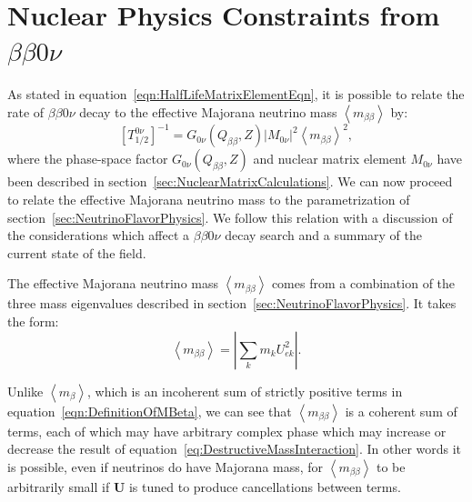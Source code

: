 \section{Nuclear Physics Constraints from \texorpdfstring{$\beta\beta 0\nu$}{Neutrinoless Double-Beta}}\label{sec:NucPhysConstraintsFromBB0N}

As stated in equation~\ref{eqn:HalfLifeMatrixElementEqn}, it is possible to relate the rate of $\beta\beta 0\nu$ decay to the effective Majorana neutrino mass $\left< m_{\beta\beta} \right>$ by:
\begin{equation}\label{eqn:HalfLifeMatrixElementEqn_thelatter}
\left[T^{0\nu}_{1/2}\right]^{-1} = G_{0\nu}(Q_{\beta\beta}, Z) \left| M_{0\nu}\right|^2 \left< m_{\beta\beta} \right>^2,
\end{equation}
where the phase-space factor $G_{0\nu}(Q_{\beta\beta}, Z)$ and nuclear matrix element $M_{0\nu}$ have been described in section~\ref{sec:NuclearMatrixCalculations}.  We can now proceed to relate the effective Majorana neutrino mass to the parametrization of section~\ref{sec:NeutrinoFlavorPhysics}.  We follow this relation with a discussion of the considerations which affect a $\beta\beta 0\nu$ decay search and a summary of the current state of the field.

The effective Majorana neutrino mass $\left< m_{\beta\beta} \right>$ comes from a combination of the three mass eigenvalues described in section~\ref{sec:NeutrinoFlavorPhysics}.  It takes the form:
\begin{equation} \label{eq:DestructiveMassInteraction}
\left< m_{\beta\beta} \right> = \left|\sum_k m_k U_{ek}^2\right|.
\end{equation}

Unlike $\left< m_\beta \right>$, which is an incoherent sum of strictly positive terms in equation~\ref{eqn:DefinitionOfMBeta}, we can see that $\left< m_{\beta\beta} \right>$ is a coherent sum of terms, each of which may have arbitrary complex phase which may increase or decrease the result of equation~\ref{eq:DestructiveMassInteraction}.  In other words it is possible, even if neutrinos do have Majorana mass, for $\left< m_{\beta\beta} \right>$ to be arbitrarily small if $\mathbf{U}$ is tuned to produce cancellations between terms.

